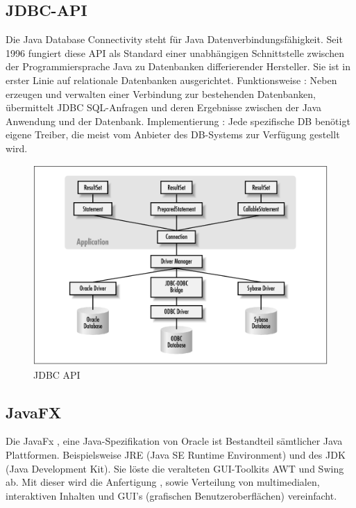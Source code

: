 \documentclass[a4paper, 12pt]{scrartcl}
\begin{document}
\subsection{JDBC-API}
Die Java Database Connectivity steht für Java Datenverbindungsfähigkeit. Seit 1996 fungiert diese API  als Standard einer unabhängigen Schnittstelle zwischen der Programmiersprache Java zu Datenbanken differierender Hersteller. Sie ist in erster Linie auf relationale Datenbanken ausgerichtet.
\newline
\newline
Funktionsweise :
Neben erzeugen und verwalten einer Verbindung zur bestehenden Datenbanken,  übermittelt JDBC SQL-Anfragen und deren Ergebnisse zwischen der Java Anwendung und der Datenbank.
\newline
\newline
Implementierung :
Jede spezifische DB benötigt eigene Treiber, die meist vom Anbieter des DB-Systems zur Verfügung gestellt wird.
\newline
\newline
\begin{figure}[h]
	\centering
	\includegraphics[scale=0.55]{jsp.png}
	\caption{JDBC API}
	\label{img:JDBC}
\end{figure}
\newpage

\subsection{JavaFX} 

Die JavaFx , eine Java-Spezifikation von Oracle ist Bestandteil sämtlicher Java Plattformen. Beispielsweise JRE (Java SE Runtime Environment) und des JDK (Java Development Kit).
Sie löste die veralteten GUI-Toolkits AWT und Swing ab.
Mit dieser wird die Anfertigung , sowie Verteilung von multimedialen, interaktiven Inhalten und GUI’s (grafischen Benutzeroberflächen) vereinfacht.
\end{document}
